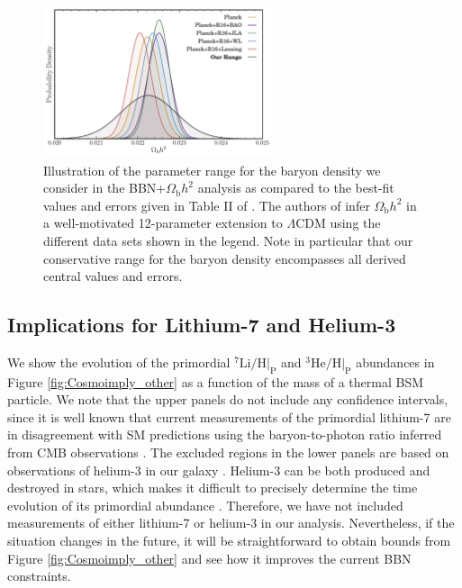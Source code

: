 \begin{figure}[t]
    \centering
    \includegraphics[width=0.6\textwidth]{figures/omegabposteriors.pdf}\vspace{-0.3cm}
    \caption{Illustration of the parameter range for the baryon density we consider in the BBN+$\Omega_{\mathrm{b}}h^2$ analysis as compared to the best-fit values and errors given in Table II of \cite{DiValentino:2017zyq}. The authors of \cite{DiValentino:2017zyq} infer $\Omega_{\mathrm{b}}h^2$ in a well-motivated 12-parameter extension to $\Lambda$CDM using the different data sets shown in the legend. Note in particular that our conservative range for the baryon density encompasses all derived central values and errors.}
    \label{fig:omegab}
\end{figure}
\subsection{Implications for Lithium-7 and Helium-3}
\label{app:cosmo_imp_other}
We show the evolution of the primordial $^7\mathrm{Li}/\mathrm{H}|_{\mathrm{P}}$ and $^3\mathrm{He}/\mathrm{H}|_{\mathrm{P}}$ abundances in Figure \ref{fig:Cosmoimply_other} as a function of the mass of a thermal BSM particle. We note that the upper panels do not include any confidence intervals, since it is well known that current measurements of the primordial lithium-7 are in disagreement with SM predictions using the baryon-to-photon ratio inferred from CMB observations \cite{pdg}. The excluded regions in the lower panels are based on observations of helium-3 in our galaxy \cite{Bania:2002yj}. Helium-3 can be both produced and destroyed in stars, which makes it difficult to precisely determine the time evolution of its primordial abundance \cite{VangioniFlam:2002sa}. Therefore, we have not included measurements of either lithium-7 or helium-3 in our analysis. Nevertheless, if the situation changes in the future, it will be straightforward to obtain bounds from Figure \ref{fig:Cosmoimply_other} and see how it improves the current BBN constraints.
\clearpage

